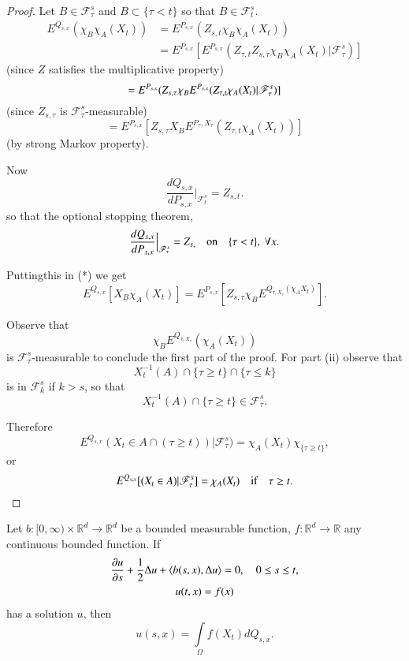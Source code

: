\begin{proof}
Let $B\in \mathscr{F}^{s}_{\tau}$ and $B\subset \{\tau<t\}$ so that
$B\in \mathscr{F}^{s}_{t}$.
\begin{align*}
E^{Q_{s,x}}(\chi_{B}\chi_{A}(X_{t})) &=
E^{P_{s,x}}(Z_{s,t}\chi_{B}\chi_{A}(X_{t}))\\
&=
E^{P_{s,x}}[E^{P_{s,x}}(Z_{\tau,t}Z_{s,\tau}\chi_{B}\chi_{A}(X_{t})|\mathscr{F}^{s}_{\tau})] 
\end{align*}
(since $Z$ satisfies the multiplicative property)
$$
=E^{P_{s,x}}(Z_{s,\tau}\chi_{B}E^{P_{s,x}}(Z_{\tau,t}\chi_{A}(X_{t})|\mathscr{F}^{s}_{\tau})]\\ 
$$
(since $Z_{s,\tau}$ is $\mathscr{F}^{s}_{\tau}$-measurable)
\begin{equation*}
=E^{P_{s,x}}[Z_{s,\tau}X_{B}E^{P_{\tau},X_{\tau}}(Z_{\tau,t}\chi_{A}(X_{t}))]\tag{*} 
\end{equation*}
(by strong Markov property).

Now 
$$
\frac{dQ_{s,x}}{dP_{s,x}}\Big|_{\mathscr{F}^{s}_{t}}=Z_{s,t}.
$$
so that the optional stopping theorem,
$$
\frac{dQ_{s,x}}{dP_{s,x}}\Big|_{\mathscr{F}^{s}_{\tau}}=Z_{s,}\quad\text{on}\quad
\{\tau<t\},\ \forall x.
$$

Putting\pageoriginale this in (*) we get
$$
E^{Q_{s,x}}[X_{B}\chi_{A}(X_{t})]=E^{P_{s,x}}[Z_{s,\tau}\chi_{B}E^{Q_{\tau,X_{\tau}}(\chi_{A}X_{t})}].
$$

Observe that
$$
\chi_{B}E^{Q_{\tau,X_{\tau}}}(\chi_{A}(X_{t}))
$$
is $\mathscr{F}^{s}_{\tau}$-measurable to conclude the first part of
the proof. For part (ii) observe that
$$
X^{-1}_{t}(A)\cap \{\tau\geq t\}\cap \{\tau\leq k\}
$$
is in $\mathscr{F}^{s}_{k}$ if $k>s$, so that
$$
X^{-1}_{t}(A)\cap \{\tau\geq t\}\in \mathscr{F}^{s}_{\tau}.
$$

Therefore
$$
E^{Q_{s,x}}(X_{t}\in A\cap(\tau\geq
t))|\mathscr{F}^{s}_{\tau})=\chi_{A}(X_{t})\chi_{\{\tau\geq t\}},
$$
or 
$$
E^{Q_{s,x}}[(X_{t}\in
  A)|\mathscr{F}^{s}_{\tau}]=\chi_{A}(X_{t})\quad\text{if}\quad \tau\geq t.
$$
\end{proof}

\begin{prop*}
Let $b:[0,\infty)\times \mathbb{R}^{d}\to \mathbb{R}^{d}$ be a
  bounded measurable function, $f:\mathbb{R}^{d}\to \mathbb{R}$ any
  continuous bounded function. If
\begin{gather*}
\frac{\partial u}{\partial s}+\frac{1}{2}\Delta u+\langle b(s,x),\Delta
u\rangle=0,\quad 0\leq s\leq t,\\
u(t,x)=f(x)
\end{gather*}
has a solution $u$, then
$$
u(s,x)=\int\limits_{\Omega}f(X_{t})dQ_{s,x}.
$$
\end{prop*}

